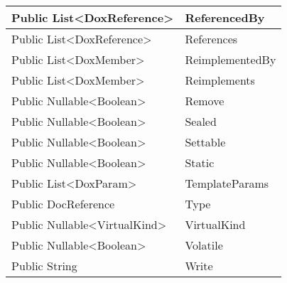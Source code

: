 \documentclass[11pt, oneside, a4paper]{book}
\begin{document}
\begin{center}
\begin{tabular}{| p{3cm} | p{12cm} | }
\hline
 Public  List<DoxReference> &  ReferencedBy\hypertarget{SoftwareEngineeringTools.{}Documentation.{}MemberEnum.{}ReferencedBy}{}\\
\hline
 Public  List<DoxReference> &  References\hypertarget{SoftwareEngineeringTools.{}Documentation.{}MemberEnum.{}References}{}\\
\hline
 Public  List<DoxMember> &  ReimplementedBy\hypertarget{SoftwareEngineeringTools.{}Documentation.{}MemberEnum.{}ReimplementedBy}{}\\
\hline
 Public  List<DoxMember> &  Reimplements\hypertarget{SoftwareEngineeringTools.{}Documentation.{}MemberEnum.{}Reimplements}{}\\
\hline
 Public  Nullable<Boolean> &  Remove\hypertarget{SoftwareEngineeringTools.{}Documentation.{}MemberEnum.{}Remove}{}\\
\hline
 Public  Nullable<Boolean> &  Sealed\hypertarget{SoftwareEngineeringTools.{}Documentation.{}MemberEnum.{}Sealed}{}\\
\hline
 Public  Nullable<Boolean> &  Settable\hypertarget{SoftwareEngineeringTools.{}Documentation.{}MemberEnum.{}Settable}{}\\
\hline
 Public  Nullable<Boolean> &  Static\hypertarget{SoftwareEngineeringTools.{}Documentation.{}MemberEnum.{}Static}{}\\
\hline
 Public  List<DoxParam> &  TemplateParams\hypertarget{SoftwareEngineeringTools.{}Documentation.{}MemberEnum.{}TemplateParams}{}\\
\hline
 Public  DocReference &  Type\hypertarget{SoftwareEngineeringTools.{}Documentation.{}MemberEnum.{}Type}{}\\
\hline
 Public  Nullable<VirtualKind> &  VirtualKind\hypertarget{SoftwareEngineeringTools.{}Documentation.{}MemberEnum.{}VirtualKind}{}\\
\hline
 Public  Nullable<Boolean> &  Volatile\hypertarget{SoftwareEngineeringTools.{}Documentation.{}MemberEnum.{}Volatile}{}\\
\hline
 Public  String &  Write\hypertarget{SoftwareEngineeringTools.{}Documentation.{}MemberEnum.{}Write}{}\\
\hline
\end{tabular}
\end{center}
\end{document}
